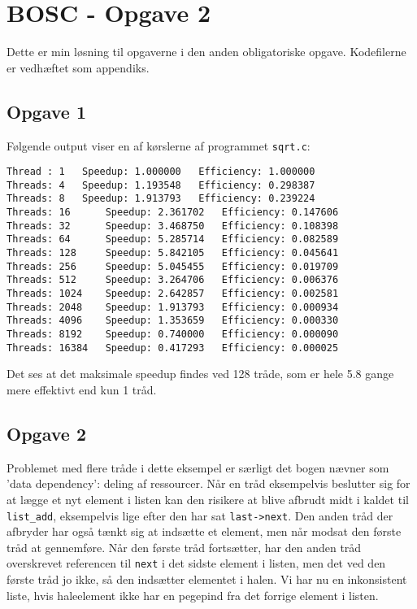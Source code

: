 \documentclass{article}
\begin{document}
\section*{BOSC - Opgave 2}
Dette er min løsning til opgaverne i den anden obligatoriske opgave. Kodefilerne er vedhæftet som appendiks. 

\subsection*{Opgave 1}
Følgende output viser en af kørslerne af programmet \texttt{sqrt.c}:
\begin{verbatim}
Thread : 1 	 Speedup: 1.000000 	 Efficiency: 1.000000
Threads: 4 	 Speedup: 1.193548 	 Efficiency: 0.298387
Threads: 8 	 Speedup: 1.913793 	 Efficiency: 0.239224
Threads: 16 	 Speedup: 2.361702 	 Efficiency: 0.147606
Threads: 32 	 Speedup: 3.468750 	 Efficiency: 0.108398
Threads: 64 	 Speedup: 5.285714 	 Efficiency: 0.082589
Threads: 128 	 Speedup: 5.842105 	 Efficiency: 0.045641
Threads: 256 	 Speedup: 5.045455 	 Efficiency: 0.019709
Threads: 512 	 Speedup: 3.264706 	 Efficiency: 0.006376
Threads: 1024 	 Speedup: 2.642857 	 Efficiency: 0.002581
Threads: 2048 	 Speedup: 1.913793 	 Efficiency: 0.000934
Threads: 4096 	 Speedup: 1.353659 	 Efficiency: 0.000330
Threads: 8192 	 Speedup: 0.740000 	 Efficiency: 0.000090
Threads: 16384 	 Speedup: 0.417293 	 Efficiency: 0.000025
\end{verbatim}
Det ses at det maksimale speedup findes ved 128 tråde, som er hele 5.8 gange mere effektivt end kun 1 tråd. 

\subsection*{Opgave 2}
Problemet med flere tråde i dette eksempel er særligt det bogen nævner som 'data dependency': deling af ressourcer. Når en tråd eksempelvis beslutter sig for at lægge et nyt element i listen kan den risikere at blive afbrudt midt i kaldet til \texttt{list\_add}, eksempelvis lige efter den har sat \texttt{last->next}. Den anden tråd der afbryder har også tænkt sig at indsætte et element, men når modsat den første tråd at gennemføre. Når den første tråd fortsætter, har den anden tråd overskrevet referencen til \texttt{next} i det sidste element i listen, men det ved den første tråd jo ikke, så den indsætter elementet i halen. Vi har nu en inkonsistent liste, hvis haleelement ikke har en pegepind fra det forrige element i listen.
\end{document}
